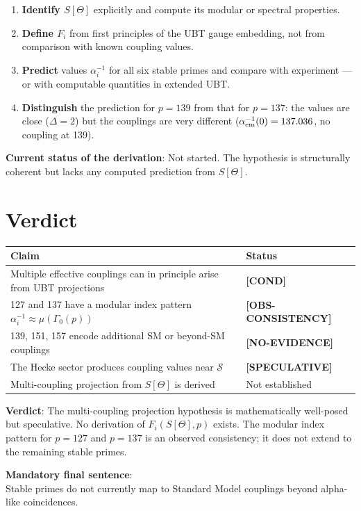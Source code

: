 \documentclass[12pt,a4paper]{article}
\theoremstyle{definition}
\theoremstyle{remark}
\newcommand{\cond}{\textcolor{blue!65!black}{\textbf{[COND]}}}
\newcommand{\obs}{\textcolor{blue!45!black}{\textbf{[OBS-CONSISTENCY]}}}
\newcommand{\noev}{\textcolor{red!65!black}{\textbf{[NO-EVIDENCE]}}}
\newcommand{\spec}{\textcolor{purple!60!black}{\textbf{[SPECULATIVE]}}}
\begin{document}
\begin{enumerate}
\item \textbf{Identify $S[\Theta]$} explicitly and compute its modular or
      spectral properties.
\item \textbf{Define $F_i$} from first principles of the UBT gauge embedding,
      not from comparison with known coupling values.
\item \textbf{Predict} values $\alpha_i^{-1}$ for all six stable primes and
      compare with experiment — or with computable quantities in extended UBT.
\item \textbf{Distinguish} the prediction for $p = 139$ from that for $p = 137$:
      the values are close ($\Delta = 2$) but the couplings are very different
      ($\alpha_{\rm em}^{-1}(0) = 137.036$, no coupling at 139).
\end{enumerate}

\begin{gapbox}
\textbf{Current status of the derivation}: Not started.  The hypothesis is
structurally coherent but lacks any computed prediction from $S[\Theta]$.
\end{gapbox}

\section{Verdict}

\begin{center}
\begin{tabular}{ll}
\toprule
Claim & Status \\
\midrule
Multiple effective couplings can in principle arise from UBT projections & \cond \\
127 and 137 have a modular index pattern $\alpha_i^{-1} \approx \mu(\Gamma_0(p))$ & \obs \\
139, 151, 157 encode additional SM or beyond-SM couplings & \noev \\
The Hecke sector produces coupling values near $\mathcal{S}$ & \spec \\
Multi-coupling projection from $S[\Theta]$ is derived & Not established \\
\bottomrule
\end{tabular}
\end{center}

\begin{resultbox}
\textbf{Verdict}: The multi-coupling projection hypothesis is mathematically
well-posed but speculative.  No derivation of $F_i(S[\Theta], p)$ exists.
The modular index pattern for $p = 127$ and $p = 137$ is an observed
consistency; it does not extend to the remaining stable primes.

\textbf{Mandatory final sentence}:\\
Stable primes do not currently map to Standard Model couplings beyond
alpha-like coincidences.
\end{resultbox}
\end{document}
